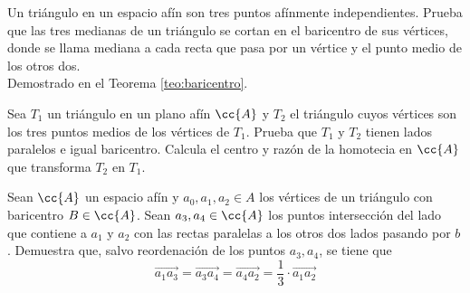 \begin{ejercicio}
    Un triángulo en un espacio afín son tres puntos afínmente independientes. Prueba que las tres medianas de un triángulo se cortan en el baricentro de sus vértices, donde se llama mediana a cada recta que pasa por un vértice y el punto medio de los otros dos.\\

    Demostrado en el Teorema \ref{teo:baricentro}.
\end{ejercicio}

\begin{ejercicio}
    Sea $T_1$ un triángulo en un plano afín $\cc{A}$ y $T_2$ el triángulo cuyos vértices son los tres puntos medios de los vértices de $T_1$. Prueba que $T_1$ y $T_2$ tienen lados paralelos e igual baricentro. Calcula el centro y razón de la homotecia en $\cc{A}$ que transforma $T_2$ en $T_1$.
\end{ejercicio}

\begin{ejercicio}
    Sean $\cc{A}$ un espacio afín y $a_0, a_1, a_2 \in A$ los vértices de un triángulo con baricentro $B \in \cc{A}$. Sean $a_3, a_4 \in \cc{A}$ los puntos intersección del lado que contiene a $a_1$ y $a_2$ con las rectas paralelas a los otros dos lados pasando por $b$. Demuestra que, salvo reordenación de los puntos $a_3, a_4$, se tiene que
    \begin{equation*}
        \vec{a_1a_3} = \vec{a_3a_4}= \vec{a_4a_2} = \frac{1}{3} \cdot \vec{a_1a_2}
    \end{equation*}
\end{ejercicio}

